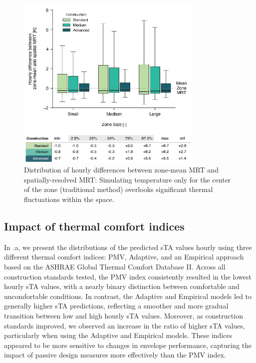 \begin{figure}[H]
    \centering
    \includegraphics[width=8.9cm]{manuscript/src/figures/zone-mean-v-spatial.png}
    \caption{Distribution of hourly differences between zone-mean MRT and spatially-resolved MRT: Simulating temperature only for the center of the zone (traditional method) overlooks significant thermal fluctuations within the space.}
    \label{fig:zone-mean-v-spatial}
\end{figure}


\subsection{Impact of thermal comfort indices}

In .a, we present the distributions of the predicted sTA values hourly using three different thermal comfort indices: PMV, Adaptive, and an Empirical approach based on the ASHRAE Global Thermal Comfort Database II. Across all construction standards tested, the PMV index consistently resulted in the lowest hourly sTA values, with a nearly binary distinction between comfortable and uncomfortable conditions. In contrast, the Adaptive and Empirical models led to generally higher sTA predictions, reflecting a smoother and more gradual transition between low and high hourly sTA values. Moreover, as construction standards improved, we observed an increase in the ratio of higher sTA values, particularly when using the Adaptive and Empirical models. These indices appeared to be more sensitive to changes in envelope performance, capturing the impact of passive design measures more effectively than the PMV index.

